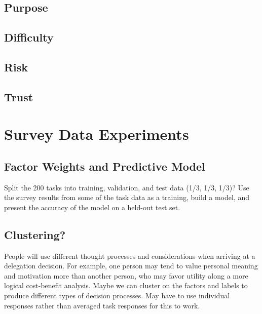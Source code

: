 \documentclass[letterpaper]{article} %
\begin{document}
\subsection{Purpose}
\subsection{Difficulty}
\subsection{Risk}
\subsection{Trust}


\section{Survey Data Experiments}

\subsection{Factor Weights and Predictive Model}
Split the 200 tasks into training, validation, and test data (1/3, 1/3, 1/3)? Use the survey results from some of the task data as a training, build a model, and present the accuracy of the model on a held-out test set.

\subsection{Clustering?}
People will use different thought processes and considerations when arriving at a delegation decision. For example, one person may tend to value personal meaning and motivation more than another person, who may favor utility along a more logical cost-benefit analysis. Maybe we can cluster on the factors and labels to produce different types of decision processes. May have to use individual responses rather than averaged task responses for this to work. 



\end{document}
